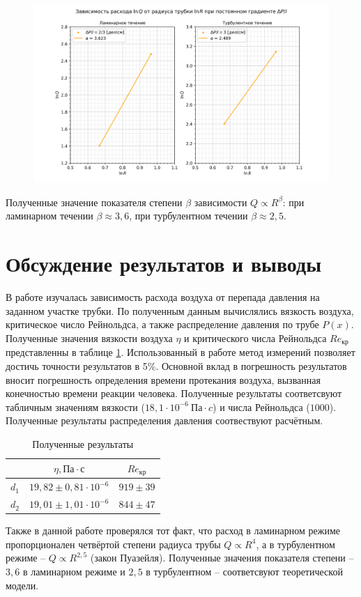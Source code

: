 \documentclass[a4paper, 12pt]{article}
\begin{document}
\begin{figure}[h!]
\begin{flushleft}
    \includegraphics[scale=0.75]{1.3.3_5.png}
\end{flushleft}
\caption{}
\label{ris10}
\end{figure}
Полученные значение показателя степени $\beta$ зависимости $Q \propto R^{\beta}$: при ламинарном течении $\beta \approx 3,6$, при турбулентном течении $\beta \approx 2,5$.

\section{Обсуждение результатов и выводы}
\par В работе изучалась зависимость расхода воздуха от перепада давления на заданном участке трубки. По полученным данным вычислялись вязкость воздуха, критическое число Рейнольдса, а также распределение давления по трубе $P(x)$. Полученные значения вязкости воздуха $\eta$ и критического числа Рейнольдса $Re_{кр}$ представленны в таблице \ref{tab9}. Использованный в работе метод измерений позволяет достичь точности результатов в 5\%. Основной вклад в погрешность результатов вносит погрешность определения времени протекания воздуха, вызванная конечностью времени реакции человека. Полученные результаты соответсвуют табличным значениям вязкости ($18,1 \cdot 10^{-6}~Па \cdot c$) и числа Рейнольдса ($1000$). Полученные результаты распределения давления соотвествуют расчётным.
\begin{table}[h!]
\begin{center}
\begin{tabular}{|c|c|c|}
\hline
      & $\eta, Па \cdot с$           & $Re_{кр}$  \\ \hline
$d_1$ & $19,82\pm0,81 \cdot 10^{-6}$ & $919\pm39$ \\ \hline
$d_2$ & $19,01\pm1,01 \cdot 10^{-6}$ & $844\pm47$ \\ \hline
\end{tabular}
\caption{Полученные результаты}
\label{tab9}
\end{center}
\end{table}
\par Также в данной работе проверялся тот факт, что расход в ламинарном режиме пропорционален четвёртой степени радиуса трубы $Q \propto R^{4}$, а в турбулентном режиме -- $Q \propto R^{2,5}$ (закон Пуазейля). Полученные значения показателя степени -- $3,6$ в ламинарном режиме и $2,5$ в турбулентном -- соответсвуют теоретической модели.
\end{document}
